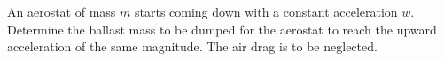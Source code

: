 \item An aerostat of mass \( m \) starts coming down with a constant acceleration \( w \). Determine the ballast mass to be dumped for the aerostat to reach the upward acceleration of the same magnitude. The air drag is to be neglected.